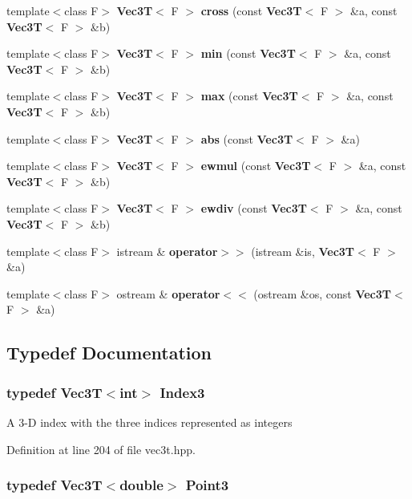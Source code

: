 \begin{CompactItemize}
\item 
template$<$class F$>$ {\bf Vec3T}$<$ F $>$ {\bf cross} (const {\bf Vec3T}$<$ F $>$ \&a, const {\bf Vec3T}$<$ F $>$ \&b)
\item 
template$<$class F$>$ {\bf Vec3T}$<$ F $>$ {\bf min} (const {\bf Vec3T}$<$ F $>$ \&a, const {\bf Vec3T}$<$ F $>$ \&b)
\item 
template$<$class F$>$ {\bf Vec3T}$<$ F $>$ {\bf max} (const {\bf Vec3T}$<$ F $>$ \&a, const {\bf Vec3T}$<$ F $>$ \&b)
\item 
template$<$class F$>$ {\bf Vec3T}$<$ F $>$ {\bf abs} (const {\bf Vec3T}$<$ F $>$ \&a)
\item 
template$<$class F$>$ {\bf Vec3T}$<$ F $>$ {\bf ewmul} (const {\bf Vec3T}$<$ F $>$ \&a, const {\bf Vec3T}$<$ F $>$ \&b)
\item 
template$<$class F$>$ {\bf Vec3T}$<$ F $>$ {\bf ewdiv} (const {\bf Vec3T}$<$ F $>$ \&a, const {\bf Vec3T}$<$ F $>$ \&b)
\item 
template$<$class F$>$ istream \& {\bf operator$>$$>$} (istream \&is, {\bf Vec3T}$<$ F $>$ \&a)
\item 
template$<$class F$>$ ostream \& {\bf operator$<$$<$} (ostream \&os, const {\bf Vec3T}$<$ F $>$ \&a)
\end{CompactItemize}


\subsection{Typedef Documentation}
\subsubsection{\setlength{\rightskip}{0pt plus 5cm}typedef {\bf Vec3T}$<$int$>$ {\bf Index3}}\label{vec3t_8hpp_0623fc5cf1ef86a13f6117dcc56217fa_0623fc5cf1ef86a13f6117dcc56217fa}


A 3-D index with the three indices represented as integers 

Definition at line 204 of file vec3t.hpp.
\subsubsection{\setlength{\rightskip}{0pt plus 5cm}typedef {\bf Vec3T}$<$double$>$ {\bf Point3}}\label{vec3t_8hpp_ce7952f9a96e365badec9acf7e6990bf_ce7952f9a96e365badec9acf7e6990bf}


